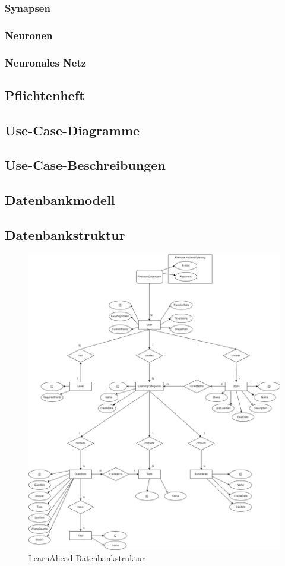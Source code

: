 \subsubsection{Synapsen}
\subsubsection{Neuronen}
\subsubsection{Neuronales Netz}
\subsection{Pflichtenheft}
\subsection{Use-Case-Diagramme}
\subsection{Use-Case-Beschreibungen}
\newpage
\subsection{Datenbankmodell}
\subsection{Datenbankstruktur}
\begin{figure}[H]
    \centering
    \includegraphics[width=1\textwidth]{images/LearnAheadDatenbankstruktur.png}
    \caption{LearnAhead Datenbankstruktur}
    \label{fig:LearnAheadDatenbankstruktur}
\end{figure}\noindent
